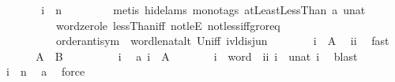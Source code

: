 \begin{isabellebody}
\ \ \ \ \isamarkupfalse%
\ \isamarkupfalse%
\ {\isachardoublequoteopen}i{\isacharprime}\ {\isasymin}\ {\isacharbraceleft}{}{\isachardot}{\isachardot}{\isacharless}n{\isacharbraceright}{\isachardoublequoteclose}\ \isanewline
\ \ \ \ \ \ \isamarkupfalse%
\ {\isacharparenleft}metis\ {\isacharparenleft}hide{\isacharunderscore}lams{\isacharcomma}\ mono{\isacharunderscore}tags{\isacharparenright}\ atLeast{}LessThan\ a\ unat{\isacharunderscore}{}\isanewline
\ \ \ \ \ \ \ \ \ \ word{\isacharunderscore}zero{\isacharunderscore}le\ lessThan{\isacharunderscore}iff\ not{\isacharunderscore}leE\ not{\isacharunderscore}less{\isacharunderscore}iff{\isacharunderscore}gr{\isacharunderscore}or{\isacharunderscore}eq\ \isanewline
\ \ \ \ \ \ \ \ \ \ order{\isacharunderscore}antisym\ \ word{\isacharunderscore}le{\isacharunderscore}nat{\isacharunderscore}alt\ Un{\isacharunderscore}iff\ ivl{\isacharunderscore}disj{\isacharunderscore}un{\isacharparenleft}{}{\isacharparenright}{\isacharparenright}\ \isanewline
\ \ \ \ \isamarkupfalse%
\ \ {\isachardoublequoteopen}i\ {\isasymin}\ {\isacharquery}A{\isachardoublequoteclose}\ \isamarkupfalse%
\ ii\ \isamarkupfalse%
\ fast\isanewline
\ \ \isamarkupfalse%
\isanewline
{}\isamarkupfalse%
\isanewline
\ \ \isamarkupfalse%
\ {\isachardoublequoteopen}{\isacharquery}A\ {\isasymsubseteq}\ {\isacharquery}B{\isachardoublequoteclose}\isanewline
\ \ \isamarkupfalse%
\isanewline
\ \ \ \ \ \isamarkupfalse%
\ i\ \isamarkupfalse%
\ a{\isacharcolon}\ {\isachardoublequoteopen}i\ {\isasymin}\ {\isacharquery}A{\isachardoublequoteclose}\isanewline
\ \ \ \ \isamarkupfalse%
\ \isamarkupfalse%
\ i{\isacharprime}{\isacharcolon}{\isacharcolon}\ {\isachardoublequoteopen}{}{}\ word{\isachardoublequoteclose}\ \ ii{\isacharcolon}\ {\isachardoublequoteopen}i{\isacharequal}\ \ unat\ i{\isacharprime}{\isachardoublequoteclose}\ \isamarkupfalse%
\ blast\isanewline
\ \ \ \ \isamarkupfalse%
\ \isamarkupfalse%
\ {\isachardoublequoteopen}i{\isacharprime}\ {\isasymin}\ {\isacharbraceleft}{}{\isachardot}{\isachardot}{\isacharless}n{\isacharbraceright}{\isachardoublequoteclose}\ \isamarkupfalse%
\ a\ \isamarkupfalse%
\ force\isanewline
\ \ \ \ \isamarkupfalse%

\end{isabellebody}
